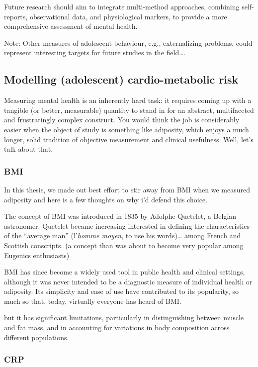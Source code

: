 \documentclass[
  letterpaper,
  DIV=11,
  numbers=noendperiod]{scrreport}
\begin{document}
Future research should aim to integrate multi-method approaches,
combining self-reports, observational data, and physiological markers,
to provide a more comprehensive assessment of mental health.

Note: Other measures of adolescent behaviour, e.g., externalizing
problems, could represent interesting targets for future studies in the
field\ldots.

\subsection{Modelling (adolescent) cardio-metabolic
risk}\label{modelling-adolescent-cardio-metabolic-risk}

Measuring mental health is an inherently hard task: it requires coming
up with a tangible (or better, measurable) quantity to stand in for an
abstract, multifaceted and frustratingly complex construct. You would
think the job is considerably easier when the object of study is
something like adiposity, which enjoys a much longer, solid tradition of
objective measurement and clinical usefulness. Well, let's talk about
that.

\subsubsection{BMI}\label{bmi}

In this thesis, we made out best effort to stir away from BMI when we
measured adiposity and here is a few thoughts on why i'd defend this
choice.

The concept of BMI was introduced in 1835 by Adolphe Quetelet, a Belgian
astronomer. Quetelet became increasing interested in defining the
characteristics of the ``average man'' (l'\emph{homme moyen}, to use his
words)\ldots{} among French and Scottish conscripts. (a concept than was
about to become very popular among Eugenics enthusiasts)

BMI has since become a widely used tool in public health and clinical
settings, although it was never intended to be a diagnostic measure of
individual health or adiposity. Its simplicity and ease of use have
contributed to its popularity, so much so that, today, virtually
everyone has heard of BMI.

but it has significant limitations, particularly in distinguishing
between muscle and fat mass, and in accounting for variations in body
composition across different populations.

\subsubsection{CRP}\label{crp}
\end{document}
